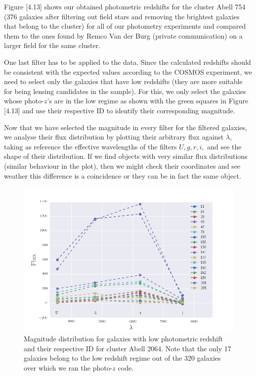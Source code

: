 Figure [4.13] shows our obtained photometric redshifts for the cluster Abell 754 (376 galaxies after filtering out field stars and removing the brightest galaxies that belong to the cluster) for all of our photometry experiments and compared them to the ones found by Remco Van der Burg (private communication) on a larger field for the same cluster. 

One last filter has to be applied to the data. Since the calculated redshifts should be consistent with the expected values according to the COSMOS experiment, we need to select only the galaxies that have low redshifts (they are more suitable for being lensing candidates in the sample). For this, we only select the galaxies whose photo-$z$'s are in the low regime as shown with the green squares in Figure [4.13] and use their respective ID to identify their corresponding magnitude. 

Now that we have selected the magnitude in every filter for the filtered galaxies, we analyse their flux distribution by plotting their arbitrary flux against $\lambda$, taking as reference the effective wavelengths of the filters $U,g,r,i,$ and see the shape of their distribution. If we find objects with very similar flux distributions (similar behaviour in the plot), then we might check their coordinates and see weather this difference is a coincidence or they can be in fact the same object.

\begin{figure}[H]
\centering
\includegraphics[width=15cm]{images/magnitude_distribution_A2064.png}
\caption[Magnitude distribution of galaxies in Abell 2064]{Magnitude distribution for galaxies with low photometric redshift and their respective ID for cluster Abell 2064. Note that the only 17 galaxies belong to the low redshift regime out of the 320 galaxies over which we ran the photo-$z$ code.}
\end{figure}

